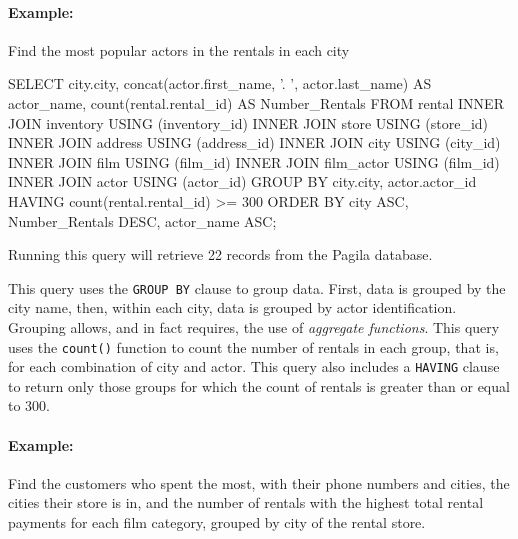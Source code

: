 \paragraph{Example:} Find the most popular actors in the rentals in each city

\begin{samepage}
\begin{sqlcode}
SELECT city.city, 
       concat(actor.first_name, '. ', actor.last_name) AS actor_name,
       count(rental.rental_id) AS Number_Rentals
  FROM rental
  INNER JOIN inventory USING (inventory_id)
  INNER JOIN store USING (store_id)
  INNER JOIN address USING (address_id)
  INNER JOIN city USING (city_id)
  INNER JOIN film USING (film_id)
  INNER JOIN film_actor USING (film_id)
  INNER JOIN actor USING (actor_id)
  GROUP BY city.city, actor.actor_id
  HAVING count(rental.rental_id) >= 300
  ORDER BY city ASC, 
           Number_Rentals DESC, 
           actor_name ASC;
\end{sqlcode}
\end{samepage}

Running this query will retrieve 22 records from the Pagila database.

This query uses the \texttt{GROUP BY} clause to group data. First, data is grouped by the city name, then, within each city, data is grouped by actor identification. Grouping allows, and in fact requires, the use of \emph{aggregate functions}. This query uses the \texttt{count()} function to count the number of rentals in each group, that is, for each combination of city and actor. This query also includes a \texttt{HAVING} clause to return only those groups for which the count of rentals is greater than or equal to 300. 

\paragraph*{Example:} Find the customers who spent the most, with their phone numbers and cities, the cities their store is in, and the number of rentals with the highest total rental payments for each film category, grouped by city of the rental store.


